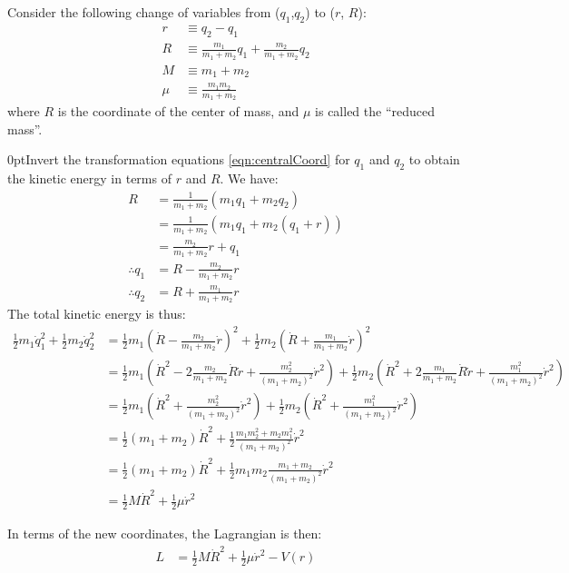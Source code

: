 Consider the following change of variables from ($q_1$,$q_2$) to ($r$, $R$):
\begin{align}
r&\equiv q_2-q_1\nonumber\\
R&\equiv \frac{m_1}{m_1+m_2}q_1+\frac{m_2}{m_1+m_2}q_2\nonumber\\
M&\equiv m_1+m_2\nonumber\\
\mu&\equiv \frac{m_1m_2}{m_1+m_2}
\label{eqn:centralCoord}
\end{align}
where $R$ is the coordinate of the center of mass, and $\mu$ is called the ``reduced mass''.
\begin{example}{0pt}{Invert the transformation equations \ref{eqn:centralCoord} for $q_1$ and $q_2$ to obtain the kinetic energy in terms of $r$ and $R$.}{}
We have:
\begin{align*}
R&=\frac{1}{m_1+m_2}(m_1q_1+m_2q_2)\nonumber\\
&=\frac{1}{m_1+m_2}(m_1q_1+m_2(q_1+r))\nonumber\\
&=\frac{m_2}{m_1+m_2}r+q_1\nonumber\\
\therefore q_1&=R-\frac{m_2}{m_1+m_2}r\nonumber\\
\therefore q_2&=R+\frac{m_1}{m_1+m_2}r\nonumber
\end{align*}
The total kinetic energy is thus:
\begin{align*}
\frac{1}{2}m_1\dot{q}_1^2+\frac{1}{2}m_2\dot{q}_2^2&=\frac{1}{2}m_1(\dot{R}-\frac{m_2}{m_1+m_2}\dot{r})^2+\frac{1}{2}m_2(\dot{R}+\frac{m_1}{m_1+m_2}\dot{r})^2\nonumber\\
&=\frac{1}{2}m_1(\dot{R}^2-2\frac{m_2}{m_1+m_2}\dot{R}\dot{r}+\frac{m_2^2}{(m_1+m_2)^2}\dot{r}^2)+\frac{1}{2}m_2(\dot{R}^2+2\frac{m_1}{m_1+m_2}\dot{R}\dot{r}+\frac{m_1^2}{(m_1+m_2)^2}\dot{r}^2)\nonumber\\
&=\frac{1}{2}m_1(\dot{R}^2+\frac{m_2^2}{(m_1+m_2)^2}\dot{r}^2)+\frac{1}{2}m_2(\dot{R}^2+\frac{m_1^2}{(m_1+m_2)^2}\dot{r}^2)\nonumber\\
&=\frac{1}{2}(m_1+m_2)\dot{R}^2+\frac{1}{2}\frac{m_1m_2^2+m_2m_1^2}{(m_1+m_2)^2}\dot{r}^2\nonumber\\
&=\frac{1}{2}(m_1+m_2)\dot{R}^2+\frac{1}{2}m_1m_2\frac{m_1+m_2}{(m_1+m_2)^2}\dot{r}^2\nonumber\\
&=\frac{1}{2}M\dot{R}^2+\frac{1}{2}\mu\dot{r}^2
\end{align*}
\end{example}

In terms of the new coordinates, the Lagrangian is then:
\begin{align}
L&=\frac{1}{2}M\dot{R}^2+\frac{1}{2}\mu\dot{r}^2-V(r)\nonumber
\end{align}

